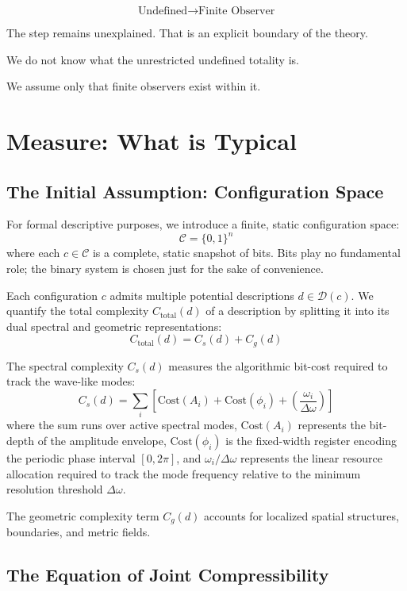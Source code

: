 \[
\text{Undefined} \rightarrow  \text{Finite Observer} 
\]

The step remains unexplained. That is an explicit boundary of the theory.

We do not know what the unrestricted undefined totality is.

We assume only that finite observers exist within it.


\section{Measure: What is Typical}


\subsection*{The Initial Assumption: Configuration Space}

For formal descriptive purposes, we introduce a finite, static configuration space:
\[
\mathcal{C} = \{0,1\}^n
\]
where each $c \in \mathcal{C}$ is a complete, static snapshot of bits.
Bits play no fundamental role; the binary system is chosen just for the sake of convenience.

Each configuration $c$ admits multiple potential descriptions $d \in \mathcal{D}(c)$.
We quantify the total complexity $C_{\text{total}}(d)$ of a description by splitting it into its dual spectral and geometric representations:
\[
C_{\text{total}}(d) = C_s(d) + C_g(d)
\]

The spectral complexity $C_s(d)$ measures the algorithmic bit-cost required to track the wave-like modes:
\[
C_s(d) = \sum_i \left[ \text{Cost}(A_i) + \text{Cost}(\phi_i) + \left(\frac{\omega_i}{\Delta \omega}\right) \right]
\]
where the sum runs over active spectral modes, $\text{Cost}(A_i)$ represents the bit-depth of the amplitude envelope, $\text{Cost}(\phi_i)$ is the fixed-width register encoding the periodic phase interval $[0, 2\pi]$, and $\omega_i / \Delta \omega$ represents the linear resource allocation required to track the mode frequency relative to the minimum resolution threshold $\Delta\omega$.

The geometric complexity term $C_g(d)$ accounts for localized spatial structures, boundaries, and metric fields.



\subsection*{The Equation of Joint Compressibility}

